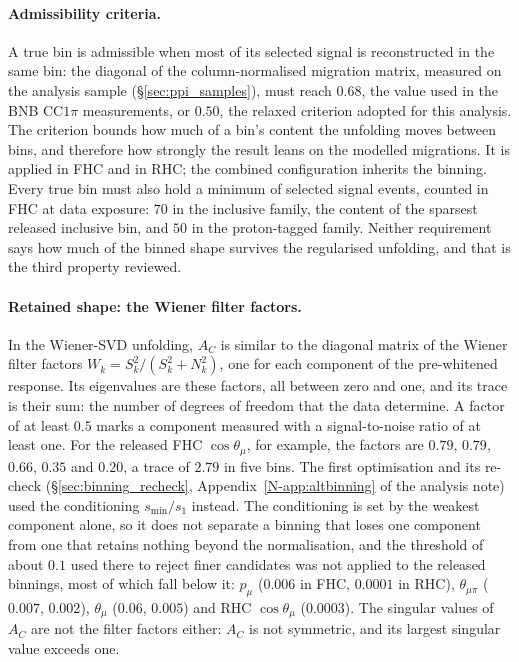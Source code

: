 \documentclass[11pt,a4paper]{article}
\newcommand{\noteref}[2]{#1~\ref{N-#2} of the analysis note}
\begin{document}
\paragraph{Admissibility criteria.}
A true bin is admissible when most of its selected signal is reconstructed in the same bin: the
diagonal of the column-normalised migration matrix, measured on the analysis sample
(\S\ref{sec:ppi_samples}), must reach $0.68$, the value used in the BNB
CC$1\pi$ measurements, or $0.50$, the relaxed criterion adopted for this analysis. The criterion bounds how much
of a bin's content the unfolding moves between bins, and therefore how strongly the result leans on
the modelled migrations. It is applied in FHC and in RHC; the combined configuration inherits the
binning. Every true bin must also hold a minimum of selected signal events, counted in FHC at data
exposure: $70$ in the inclusive family, the content of the sparsest released inclusive bin, and $50$
in the proton-tagged family. Neither requirement says how much of the binned shape survives the
regularised unfolding, and that is the third property reviewed.

\paragraph{Retained shape: the Wiener filter factors.}
In the Wiener-SVD unfolding, $A_C$ is similar to the diagonal matrix of the Wiener filter factors
$W_k=S_k^2/(S_k^2+N_k^2)$, one for each component of the pre-whitened response. Its eigenvalues are
these factors, all between zero and one, and its trace is their sum: the number of degrees of
freedom that the data determine. A factor of at least $0.5$ marks a component measured with a
signal-to-noise ratio of at least one. For the released FHC $\cos\theta_\mu$, for example, the
factors are $0.79$, $0.79$, $0.66$, $0.35$ and $0.20$, a trace of $2.79$ in five bins. The first
optimisation and its re-check (\S\ref{sec:binning_recheck}, \noteref{Appendix}{app:altbinning}) used the conditioning
$s_{\min}/s_1$ instead. The conditioning is set by the weakest component alone, so it does not
separate a binning that loses one component from one that retains nothing beyond the normalisation,
and the threshold of about $0.1$ used there to reject finer candidates was not applied to the
released binnings, most of which fall below it: $p_\mu$ ($0.006$ in FHC, $0.0001$ in RHC),
$\theta_{\mu\pi}$ ($0.007$, $0.002$), $\theta_\mu$ ($0.06$, $0.005$) and RHC $\cos\theta_\mu$
($0.0003$). The singular values of $A_C$ are not the filter factors either: $A_C$ is not
symmetric, and its largest singular value exceeds one.
\end{document}
